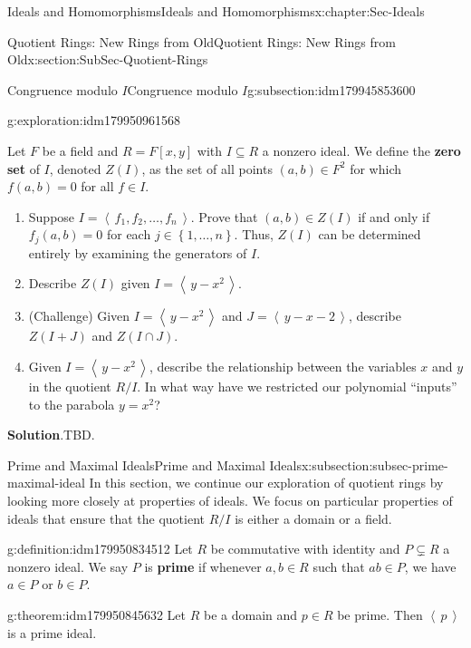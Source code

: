 \documentclass[oneside,10pt,]{book}
\newcommand{\blocktitlefont}{\relax}
\newcommand{\terminology}[1]{\textbf{#1}}
\numberwithin{equation}{section}
\newcommand{\ideal}[1]{\left\langle\, #1 \,\right\rangle}
\newcommand{\set}[1]{\left\{ {#1} \right\}}
\begin{document}
\begin{chapterptx}{Ideals and Homomorphisms}{}{Ideals and Homomorphisms}{}{}{x:chapter:Sec-Ideals}
\begin{sectionptx}{Quotient Rings: New Rings from Old}{}{Quotient Rings: New Rings from Old}{}{}{x:section:SubSec-Quotient-Rings}
\begin{subsectionptx}{Congruence modulo \(I\)}{}{Congruence modulo \(I\)}{}{}{g:subsection:idm179945853600}
\begin{exploration}{}{g:exploration:idm179950961568}
\par
Let \(F\) be a field and \(R = F[x,y]\) with \(I\subseteq R\) a nonzero ideal. We define the \terminology{zero set} of \(I\), denoted \(Z(I)\), as the set of all points \((a,b)\in F^2\) for which \(f(a,b)=0\) for all \(f\in I\).%
%
\begin{enumerate}
\item{}Suppose \(I = \ideal{f_1, f_2, \ldots, f_n}\). Prove that \((a,b)\in Z(I)\) if and only if \(f_j(a,b) = 0\) for each \(j\in \set{1,\ldots, n}\). Thus, \(Z(I)\) can be determined entirely by examining the generators of \(I\).%
\item{}Describe \(Z(I)\) given \(I = \ideal{y-x^2}\).%
\item{}(Challenge) Given \(I = \ideal{y-x^2}\) and \(J = \ideal{y-x-2}\), describe \(Z(I+J)\) and \(Z(I\cap J)\).%
\item{}Given \(I=\ideal{y-x^2}\), describe the relationship between the variables \(x\) and \(y\) in the quotient \(R/I\). In what way have we restricted our polynomial ``inputs'' to the parabola \(y = x^2\)?%
\end{enumerate}
\par\smallskip%
\noindent\textbf{\blocktitlefont Solution}.\hypertarget{g:solution:idm179951272800}{}\quad{}TBD.\end{exploration}
\end{subsectionptx}
%
%
\typeout{************************************************}
\typeout{************************************************}
%
\begin{subsectionptx}{Prime and Maximal Ideals}{}{Prime and Maximal Ideals}{}{}{x:subsection:subsec-prime-maximal-ideal}
In this section, we continue our exploration of quotient rings by looking more closely at properties of ideals. We focus on particular properties of ideals that ensure that the quotient \(R/I\) is either a domain or a field.%
\begin{definition}{}{g:definition:idm179950834512}%
%
%
Let \(R\) be commutative with identity and \(P\subsetneq R\) a nonzero ideal. We say \(P\) is \terminology{prime} if whenever \(a,b\in R\) such that \(ab\in P\), we have \(a\in P\) or \(b\in P\).%
\end{definition}
\begin{theorem}{}{}{g:theorem:idm179950845632}%
Let \(R\) be a domain and \(p\in R\) be prime. Then \(\ideal{p}\) is a prime ideal.%
\end{theorem}

\end{subsectionptx}
\end{sectionptx}
\end{chapterptx}
\end{document}
